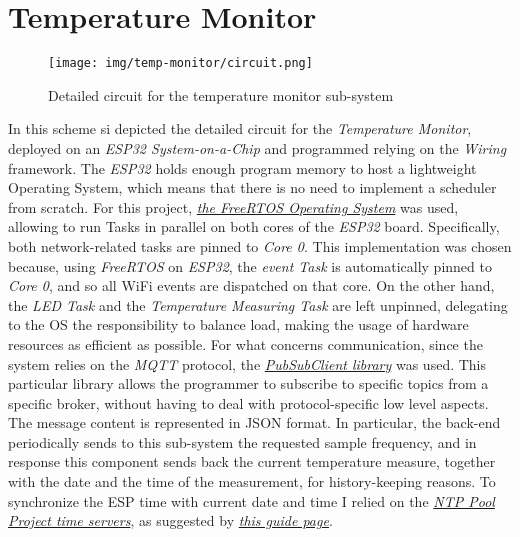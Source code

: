 \documentclass[a4paper,12pt]{report}
\begin{document}
	\section{Temperature Monitor}
	\begin{figure}[H]
		\centering{}
		\texttt{[image: img/temp-monitor/circuit.png]}
		\caption{Detailed circuit for the temperature monitor sub-system}
		\label{img:temp-monitor/circuit}
	\end{figure}
	In this scheme si depicted the detailed circuit for the \textit{Temperature Monitor}, deployed on an \textit{ESP32 System-on-a-Chip} and programmed relying on the \textit{Wiring} framework.
	\newline The \textit{ESP32} holds enough program memory to host a lightweight Operating System, which means that there is no need to implement a scheduler from scratch. For this project, \href{https://www.freertos.org/}{\textit{the FreeRTOS Operating System}} was used, allowing to run Tasks in parallel on both cores of the \textit{ESP32} board.
	\newline Specifically, both network-related tasks are pinned to \textit{Core 0}. This implementation was chosen because, using \textit{FreeRTOS} on \textit{ESP32}, the \textit{event Task} is automatically pinned to \textit{Core 0}, and so all WiFi events are dispatched on that core. On the other hand, the \textit{LED Task} and the \textit{Temperature Measuring Task} are left unpinned, delegating to the OS the responsibility to balance load, making the usage of hardware resources as efficient as possible.
	\newline For what concerns communication, since the system relies on the \textit{MQTT} protocol, the \href{https://pubsubclient.knolleary.net/}{\textit{PubSubClient library}} was used. This particular library allows the programmer to subscribe to specific topics from a specific broker, without having to deal with protocol-specific low level aspects. The message content is represented in JSON format. In particular, the back-end periodically sends to this sub-system the requested sample frequency, and in response this component sends back the current temperature measure, together with the date and the time of the measurement, for history-keeping reasons.
	\newline To synchronize the ESP time with current date and time I relied on the \href{https://www.ntppool.org/en/}{\textit{NTP Pool Project time servers}}, as suggested by \href{https://www.programmingelectronics.com/esp32-time-servers/}{\textit{this guide page}}.
\end{document}
